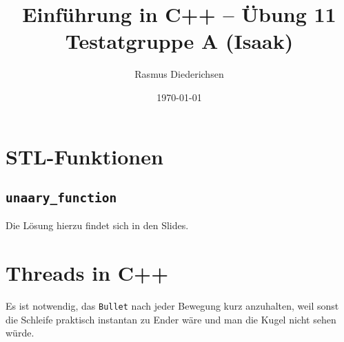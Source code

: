 \documentclass{article}
\title{Einführung in C++ -- Übung 11 \\ Testatgruppe A (Isaak)}
\author{Rasmus Diederichsen}
\date{\today}
\begin{document}
   \maketitle

   \section{STL-Funktionen}
   
   \subsection{\texttt{unaary\_function}}
   
   Die Lösung hierzu findet sich in den Slides.
   
   

   \subsection{}
   
   \section{Threads in C++}
   
   

   Es ist notwendig, das \texttt{Bullet} nach jeder Bewegung kurz anzuhalten,
   weil sonst die Schleife praktisch instantan zu Ender wäre und man die Kugel
   nicht sehen würde.
   
\end{document}
